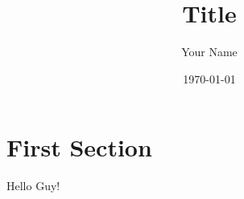 \documentclass{article}
\title{Title}
\author{Your Name}
\date{\today}
\begin{document}
\maketitle

\section{First Section}

Hello Guy!
\end{document}
